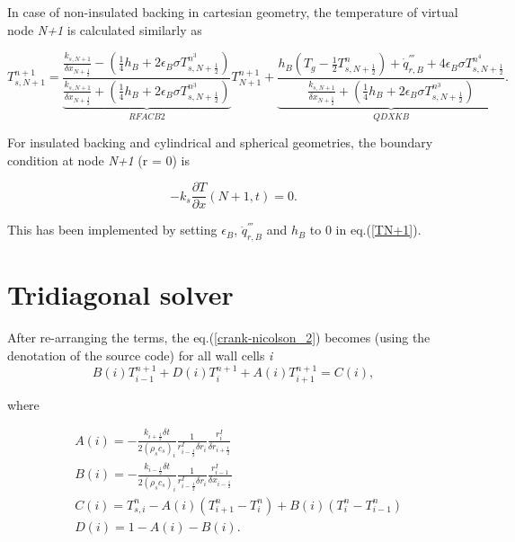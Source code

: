In case of non-insulated backing in cartesian geometry, the temperature of virtual node \textit{N+1} is calculated similarly as

\begin{equation}
\label{TN+1}
  T_{s,N+1}^{n+1} = \underbrace{\frac{\frac{k_{s,N+1}}{\delta x_{N+\frac{1}{2}}}-(\frac{1}{4}h_B+2\epsilon_B \sigma T_{s,N+\frac{1}{2}}^{n^3})}{\frac{k_{s,N+1}}{\delta x_{N+\frac{1}{2}}}+(\frac{1}{4}h_B+2\epsilon_B \sigma T_{s,N+\frac{1}{2}}^{n^3})}}_{RFACB2} T_{N+1}^{n+1}+
 \underbrace{\frac{h_B(T_g-\frac{1}{2}T_{s,N+\frac{1}{2}}^n)+\dot{q}_{r,B}^{'''}+4\epsilon_B \sigma T_{s,N+\frac{1}{2}}^{n^4}}{\frac{k_{s,N+1}}{\delta x_{N+\frac{1}{2}}}+(\frac{1}{4}h_B+2\epsilon_B \sigma T_{s,N+\frac{1}{2}}^{n^3})}}_{QDXKB}.
\end{equation}

For insulated backing and cylindrical and spherical geometries, the boundary condition at node \textit{N+1} (r = 0) is

\begin{equation}
\label{bc_back}
  -k_s \frac{\partial T}{\partial x} (N+1,t) = 0.
\end{equation}

This has been implemented by setting $\epsilon_B$, $\dot{q}_{r,B}^{'''}$ and $h_B$ to 0 in eq.(\ref{TN+1}). 

\section{Tridiagonal solver}
After re-arranging the terms, the eq.(\ref{crank-nicolson_2}) becomes (using the denotation of the source code) for all wall cells \textit{i}
 \begin{equation}
\label{tridiagonal_1}
  B(i)T_{i-1}^{n+1} + D(i)T_{i}^{n+1} + A(i)T_{i+1}^{n+1} = C(i),
\end{equation}

where

\begin{equation}
\label{tridiagonal_2}
\begin{split}
& A(i) = -\frac{k_{i+\frac{1}{2}}\delta t}{2(\rho_s c_s)_i}\frac{1}{r_{i-\frac{1}{2}}^I \delta r_i}\frac{r_{i}^I}{\delta r_{i+\frac{1}{2}}} \\
& B(i) = -\frac{k_{i-\frac{1}{2}}\delta t}{2(\rho_s c_s)_i}\frac{1}{r_{i-\frac{1}{2}}^I \delta r_i}\frac{r_{i-1}^I}{\delta x_{i-\frac{1}{2}}}  \\
& C(i) = T_{s,i}^{n}-A(i)(T_{i+1}^n-T_i^n) + B(i) (T_{i}^n-T_{i-1}^n) \\
& D(i) = 1-A(i)-B(i).  \\
\end{split}
\end{equation}

